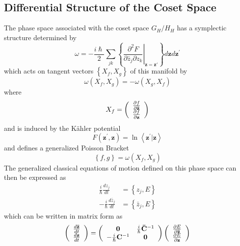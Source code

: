 \documentclass[aps,preprint]{revtex4}%
\begin{document}
\subsection{Differential Structure of the Coset Space\label{diffstruct}}

The phase space associated with the coset space $G_{H}/H_{H}$ has a symplectic
structure determined by
\begin{equation}
\omega=-\frac{i\hslash}{2}\sum_{jk}\left\{  \left.  \frac{\partial^{2}%
F}{\partial\bar{z}_{j}\partial z_{k}}\right\vert _{\mathbf{z=z\prime}%
}\right\}  d\mathbf{z}d\mathbf{z}^{\prime}%
\end{equation}
which acts on tangent vectors $\left\{  X_{f},X_{g}\right\}  $ of this
manifold by
\begin{equation}
\omega\left(  X_{f},X_{g}\right)  =-\omega\left(  X_{g},X_{f}\right)
\end{equation}
where
\begin{equation}
X_{f}=\left(
\begin{array}
[c]{c}%
\frac{\partial f}{\partial\mathbf{\bar{z}}}\\
\frac{\partial f}{\partial\mathbf{z}}%
\end{array}
\right)
\end{equation}
and is induced by the K\"{a}hler potential
\begin{equation}
F\left(  \mathbf{z}^{\prime},\mathbf{z}\right)  =\ln\left\langle
\mathbf{z}^{\prime}|\mathbf{z}\right\rangle
\end{equation}
and defines a generalized Poisson Bracket%
\begin{equation}
\left\{  f,g\right\}  =\omega\left(  X_{f},X_{g}\right)
\end{equation}
The generalized classical equations of motion defined on this phase space can
then be expressed as
\begin{align}
\frac{i}{\hslash}\frac{dz_{j}}{dt}  &  =\left\{  z_{j},E\right\} \nonumber\\
-\frac{i}{\hslash}\frac{d\bar{z}_{j}}{dt}  &  =\left\{  \bar{z}_{j},E\right\}
\label{EOM}%
\end{align}
which can be written in matrix form as
\begin{equation}
\left(
\begin{array}
[c]{c}%
\frac{d\mathbf{\bar{z}}}{dt}\\
\frac{d\mathbf{z}}{dt}%
\end{array}
\right)  =\left(
\begin{array}
[c]{cc}%
\mathbf{0} & \frac{i}{\hslash}\mathbf{\bar{C}}^{-1}\\
-\frac{i}{\hslash}\mathbf{C}^{-1} & \mathbf{0}%
\end{array}
\right)  \left(
\begin{array}
[c]{c}%
\frac{\partial E}{\partial\mathbf{\bar{z}}}\\
\frac{\partial E}{\partial\mathbf{z}}%
\end{array}
\right)
\end{equation}
\end{document}
